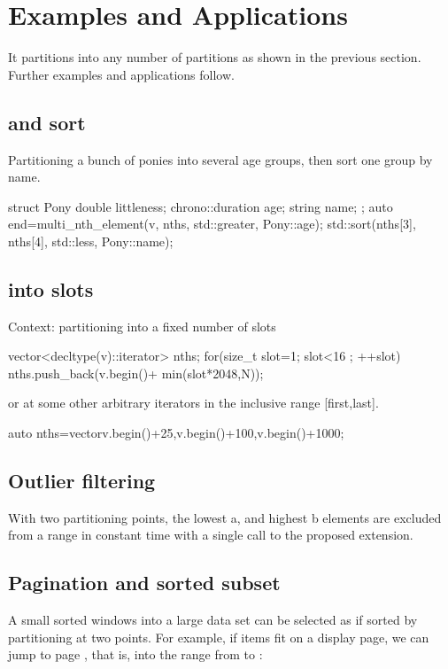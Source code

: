 \section{Examples and Applications}

It partitions into any number of partitions as shown in the previous section. Further examples and applications follow.

\subsection{ and sort}

Partitioning a bunch of ponies into several age groups, then sort one group by name.

\begin{codeblock}
struct Pony{
  double littleness; 
  chrono::duration age;
  string name;
};
auto end=multi_nth_element(v, nths, std::greater{}, Pony::age);
std::sort(nths[3], nths[4], std::less{}, Pony::name);
\end{codeblock}

\subsection{ into slots}
Context: partitioning into a fixed number of slots
\begin{codeblock}
vector<decltype(v)::iterator> nths;
for(size_t slot=1; slot<16 ; ++slot){
	nths.push_back(v.begin()+ min(slot*2048,N));
}
\end{codeblock}
or at some other arbitrary iterators in the inclusive range [first,last].
\begin{codeblock}
auto nths=vector{v.begin()+25,v.begin()+100,v.begin()+1000}; 
\end{codeblock}

\subsection{Outlier filtering}

With two partitioning points, the lowest a, and highest b elements are excluded from a range in constant time with a single call to the proposed extension.

\subsection{Pagination and sorted subset}

A small sorted windows into a large data set can be selected as if sorted by partitioning at two points. For example, if  items fit on a display page, we can jump to page , that is, into the range from  to :

